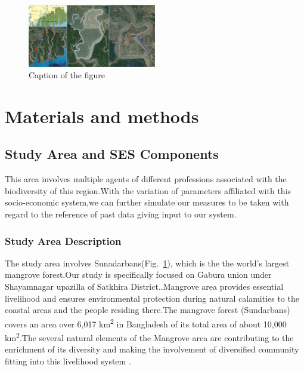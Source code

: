 \documentclass[final,5p,times,twocolumn,authoryear]{elsarticle}
\begin{document}
\begin{figure}[h]
\centering
\includegraphics[width=0.5\textwidth]{gabura.jpg}
\caption{Caption of the figure}
\label{fig:gabura}
\end{figure}


\section{ Materials and methods}
\subsection{Study Area and SES Components}
This area involves multiple agents of different professions associated with the biodiversity of this region.With the variation of parameters affiliated with this socio-economic system,we can further simulate our measures to be taken with regard to the reference of past data giving input to our system.
\subsubsection{Study Area Description}
The study area involves Sunadarbans(Fig.~\ref{fig:gabura}), which is the the world's largest mangrove forest.Our study is specifically focused on Gabura union under Shayamnagar upazilla of Satkhira District.\cite{sweety2022agent}.Mangrove area provides essential livelihood and ensures environmental protection during natural calamities to the coastal areas and the people residing there.The mangrove 
forest (Sundarbans) covers an area over 6,017 km\textsuperscript{2} in Bangladesh of its total area of about 10,000 km\textsuperscript{2}.The several natural elements of the Mangrove area are contributing to the enrichment of its diversity and making the involvement of diversified community fitting into this livelihood system .
\end{document}
